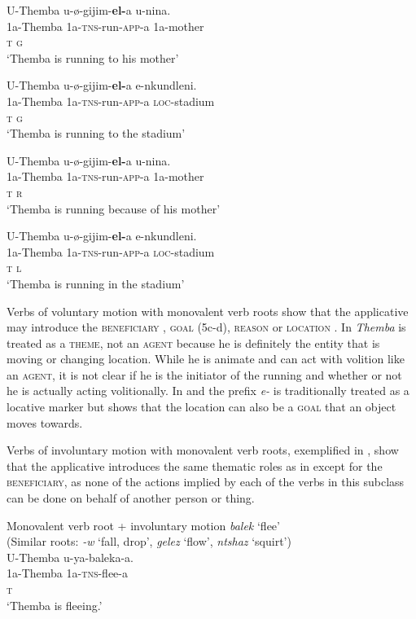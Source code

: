 \documentclass[output=paper]{langsci/langscibook}
\begin{document}
\ex
\gll U-Themba u-ø-gijim-\textbf{el-}a u-nina. \\
 1a-Themba 1a-\textsc{tns}-run-\textsc{app}-a 1a-mother\\
 \textsc{t g}\\
\glt ‘Themba is running to his mother’

\ex
\gll U-Themba u-ø-gijim-\textbf{el-}a e-nkundleni. \\
 1a-Themba 1a-\textsc{tns}-run-\textsc{app}-a \textsc{loc}-stadium\\
 \textsc{t g}\\
\glt ‘Themba is running to the stadium’

\ex
\gll U-Themba u-ø-gijim-\textbf{el-}a u-nina. \\
 1a-Themba 1a-\textsc{tns}-run-\textsc{app}-a 1a-mother\\
 \textsc{t r}\\
\glt ‘Themba is running because of his mother’

\ex
\gll U-Themba u-ø-gijim-\textbf{el-}a e-nkundleni. \\
 1a-Themba 1a-\textsc{tns}-run-\textsc{app}-a \textsc{loc}-stadium\\
 \textsc{t l}\\
\glt ‘Themba is running in the stadium’
\z
\z

Verbs of voluntary motion with monovalent verb roots show that the applicative may introduce the \textsc{beneficiary }, \textsc{goal }(5c-d), \textsc{reason } or \textsc{location }. In  \textit{Themba} is treated as a \textsc{theme}, not an \textsc{agent} because he is definitely the entity that is moving or changing location. While he is animate and can act with volition like an \textsc{agent,} it is not clear if he is the initiator of the running and whether or not he is actually acting volitionally. In  and  the prefix \textit{e-} is traditionally treated as a locative marker but  shows that the location can also be a \textsc{goal} that an object moves towards.

 Verbs of involuntary motion with monovalent verb roots, exemplified in , show that the applicative introduces the same thematic roles as in  except for the \textsc{beneficiary,} as none of the actions implied by each of the verbs in this subclass can be done on behalf of another person or thing.

\ea
{Monovalent verb root + involuntary motion \textit{balek }‘flee’}\\
 (Similar roots: \textit{-w} ‘fall, drop’, \textit{gelez} ‘flow’, \textit{ntshaz} ‘squirt’)\\
\ea
\gll U-Themba u-ya-baleka-a. \\
 1a-Themba 1a-\textsc{tns}-flee-a \\
 \textsc{t}\\
\glt ‘Themba is fleeing.’
\end{document}
